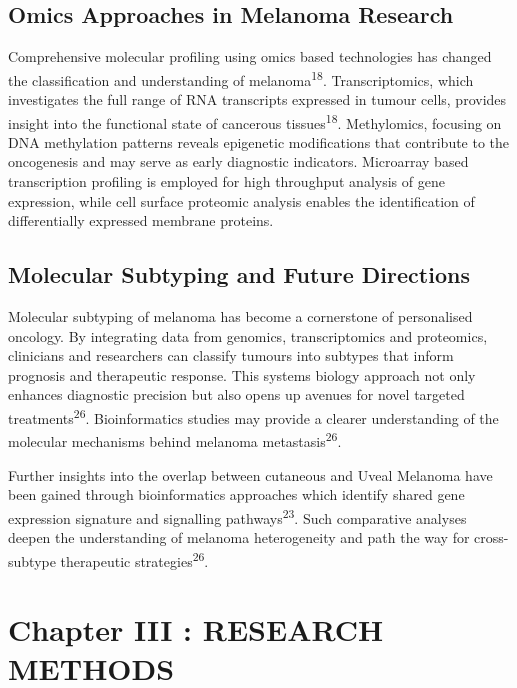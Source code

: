 \documentclass[
]{article}
\begin{document}
\subsection{Omics Approaches in Melanoma
Research}\label{omics-approaches-in-melanoma-research}

Comprehensive molecular profiling using omics based technologies has
changed the classification and understanding of
melanoma\textsuperscript{18}. Transcriptomics, which investigates the
full range of RNA transcripts expressed in tumour cells, provides
insight into the functional state of cancerous
tissues\textsuperscript{18}. Methylomics, focusing on DNA methylation
patterns reveals epigenetic modifications that contribute to the
oncogenesis and may serve as early diagnostic indicators. Microarray
based transcription profiling is employed for high throughput analysis
of gene expression, while cell surface proteomic analysis enables the
identification of differentially expressed membrane proteins.

\subsection{Molecular Subtyping and Future
Directions}\label{molecular-subtyping-and-future-directions}

Molecular subtyping of melanoma has become a cornerstone of personalised
oncology. By integrating data from genomics, transcriptomics and
proteomics, clinicians and researchers can classify tumours into
subtypes that inform prognosis and therapeutic response. This systems
biology approach not only enhances diagnostic precision but also opens
up avenues for novel targeted treatments\textsuperscript{26}.
Bioinformatics studies may provide a clearer understanding of the
molecular mechanisms behind melanoma metastasis\textsuperscript{26}.

Further insights into the overlap between cutaneous and Uveal Melanoma
have been gained through bioinformatics approaches which identify shared
gene expression signature and signalling pathways\textsuperscript{23}.
Such comparative analyses deepen the understanding of melanoma
heterogeneity and path the way for cross-subtype therapeutic
strategies\textsuperscript{26}.

\newpage

\section{Chapter III : RESEARCH
METHODS}\label{chapter-iii-research-methods}
\end{document}
